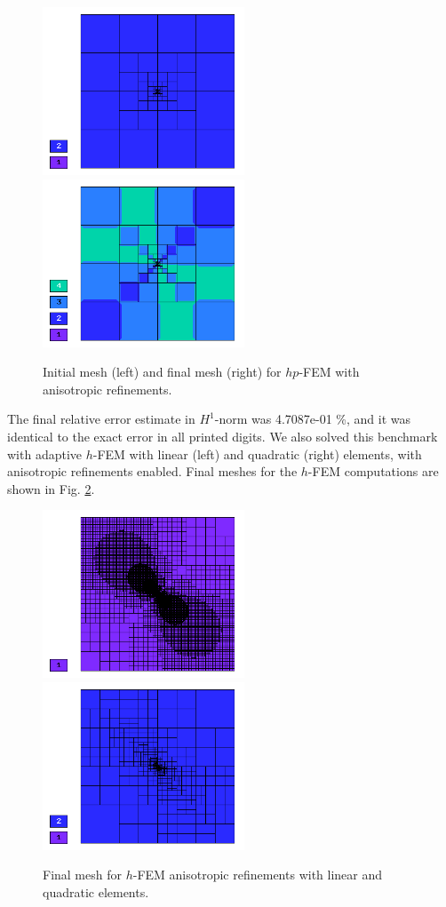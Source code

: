 \begin{figure}[!ht]
\centering
\includegraphics[height=5cm]{nist/nist-11/mesh_hp_aniso_init.png}\ \
\includegraphics[height=5cm]{nist/nist-11/mesh_hp_aniso.png}
\caption{Initial mesh (left) and final mesh (right) for $hp$-FEM with anisotropic refinements.}
\label{fig:nist-11-hp-aniso}
\end{figure}

The final relative error estimate in $H^1$-norm was 4.7087e-01 \%,
and it was identical to the exact error in all printed digits.
We also solved this benchmark with adaptive $h$-FEM
with linear (left) and quadratic (right)
elements, with anisotropic refinements enabled.
Final meshes for the $h$-FEM computations are shown
in Fig. \ref{fig:nist-11-h-aniso}.

\begin{figure}[!ht]
\centering
\includegraphics[height=5cm]{nist/nist-11/mesh_h1_aniso.png}\ \
\includegraphics[height=5cm]{nist/nist-11/mesh_h2_aniso.png}
\caption{Final mesh for $h$-FEM anisotropic refinements with linear and quadratic elements.}
\label{fig:nist-11-h-aniso}
\end{figure}

